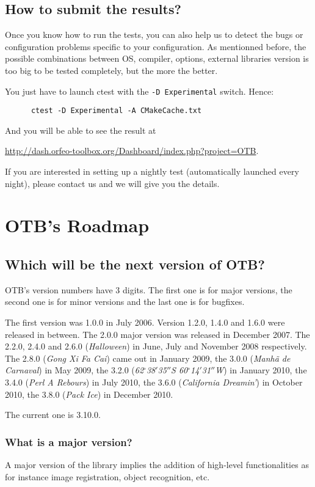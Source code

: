 \subsection{How to submit the results?}

Once you know how to run the tests, you can also help us to detect the bugs or configuration problems specific to your configuration. As mentionned before, the possible combinations between OS, compiler, options, external libraries version is too big to be tested completely, but the more the better.

You just have to launch ctest with the \texttt{-D Experimental} switch. Hence:
\begin{verbatim}
      ctest -D Experimental -A CMakeCache.txt
\end{verbatim}

And you will be able to see the result at

\url{http://dash.orfeo-toolbox.org/Dashboard/index.php?project=OTB}.

If you are interested in setting up a nightly test (automatically launched every night), please contact us and we will give you the details.

\section{OTB's Roadmap}

\subsection{Which will be the next version of OTB?}
OTB's version numbers have 3 digits. The first one is for major
versions, the second one is for minor versions and the last one is for
bugfixes.

The first version was 1.0.0 in July 2006. Version 1.2.0, 1.4.0 and 1.6.0 were
released in between. The 2.0.0 major version  was released in December 2007.
The 2.2.0, 2.4.0 and 2.6.0 ({\em Halloween}) in June, July and November 2008 respectively. The
2.8.0 ({\em Gong Xi Fa Cai}) came out in January 2009, the 3.0.0 ({\em Manh\~{a} de Carnaval}) in May 2009, the 3.2.0 ({\em 62$^\circ$38${'}$35${''}$S 60$^\circ$14${'}$31${''}$W}) in January 2010, the 3.4.0 ({\em Perl A Rebours}) in July 2010, the 3.6.0 ({\em California Dreamin'}) in October 2010, the 3.8.0 ({\em Pack Ice}) in December 2010.

The current one is 3.10.0.

\subsubsection{What is a major version?}
A major version of the library implies the addition of high-level
functionalities as for instance image registration, object recognition, etc.

